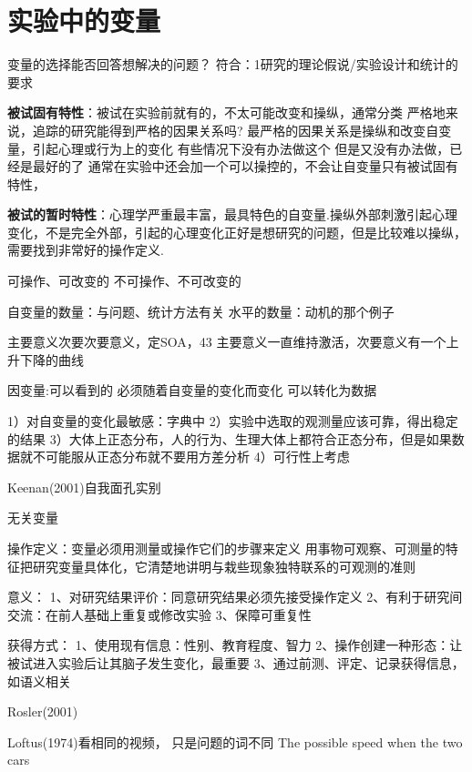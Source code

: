 \section{实验中的变量}
变量的选择能否回答想解决的问题？
符合：1研究的理论假说/实验设计和统计的要求

\textbf{被试固有特性}：被试在实验前就有的，不太可能改变和操纵，通常分类
严格地来说，追踪的研究能得到严格的因果关系吗?
最严格的因果关系是操纵和改变自变量，引起心理或行为上的变化
有些情况下没有办法做这个
但是又没有办法做，已经是最好的了
通常在实验中还会加一个可以操控的，不会让自变量只有被试固有特性，

\textbf{被试的暂时特性}：心理学严重最丰富，最具特色的自变量.操纵外部刺激引起心理变化，不是完全外部，引起的心理变化正好是想研究的问题，但是比较难以操纵，需要找到非常好的操作定义.

可操作、可改变的
不可操作、不可改变的

自变量的数量：与问题、统计方法有关
水平的数量：动机的那个例子

主要意义次要次要意义，定SOA，43
主要意义一直维持激活，次要意义有一个上升下降的曲线


因变量:可以看到的
必须随着自变量的变化而变化
可以转化为数据

1）对自变量的变化最敏感：字典中
2）实验中选取的观测量应该可靠，得出稳定的结果
3）大体上正态分布，人的行为、生理大体上都符合正态分布，但是如果数据就不可能服从正态分布就不要用方差分析
4）可行性上考虑

Keenan(2001)自我面孔实别

无关变量

操作定义：变量必须用测量或操作它们的步骤来定义
用事物可观察、可测量的特征把研究变量具体化，它清楚地讲明与栽些现象独特联系的可观测的准则

意义：
1、对研究结果评价：同意研究结果必须先接受操作定义
2、有利于研究间交流：在前人基础上重复或修改实验
3、保障可重复性

获得方式：
1、使用现有信息：性别、教育程度、智力
2、操作创建一种形态：让被试进入实验后让其脑子发生变化，最重要
3、通过前测、评定、记录获得信息，如语义相关

Rosler(2001)

Loftus(1974)看相同的视频， 只是问题的词不同
The possible speed when the two cars